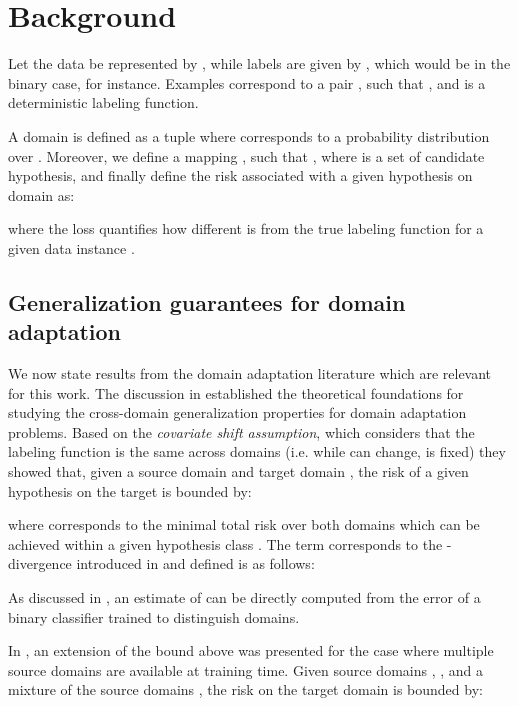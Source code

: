 \documentclass{article}
\begin{document}
\section{Background}\label{sec:background}
Let the data be represented by , while labels are given by , which would be  in the binary case, for instance. Examples correspond to a pair , such that , and  is a deterministic labeling function. 

A domain is defined as a tuple  where  corresponds to a probability distribution over . Moreover, we define a mapping , such that , where  is a set of candidate hypothesis, and finally define the risk  associated with a given hypothesis  on domain  as:

where the loss  quantifies how different  is from the true labeling function  for a given data instance .









\subsection{Generalization guarantees for domain adaptation} 
We now state results from the domain adaptation literature which are relevant for this work. 
The discussion in \cite{ben2010theory} established the theoretical foundations for studying the cross-domain generalization properties for domain adaptation problems. Based on the \emph{covariate shift assumption}, which considers that the labeling function is the same across domains (i.e. while  can change,  is fixed) they showed that, given a source domain  and target domain , the risk of a given hypothesis  on the target is bounded by:

where  corresponds to the minimal total risk over both domains which can be achieved within a given hypothesis class . The term  corresponds to the -divergence introduced in \cite{kifer2004detecting} and defined is as follows: 

As discussed in \cite{ben2007analysis}, an estimate of  can be directly computed from the error of a binary classifier trained to distinguish domains.

In \cite{zhao2018adversarial}, an extension of the bound above was presented for the case where multiple source domains are available at training time. Given  source domains , , and a mixture of the source domains , the risk  on the target domain is bounded by: 
\end{document}
